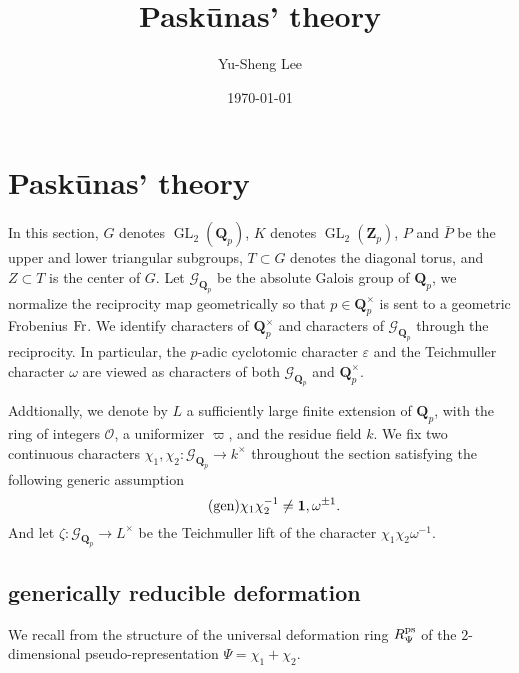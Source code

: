 \documentclass[leqno]{amsart}
\newcommand{\Gp}{\mathcal{G}_{\Qp}} %
\newcommand{\Fr}{\textnormal{Fr}} %
\newcommand{\ps}{\textnormal{ps}}
\DeclareMathOperator{\GL}{GL}
\newcommand{\Qp}{\mathbf{Q}_p}
\newcommand{\Zp}{\mathbf{Z}_p}
\newcommand{\oo}{\mathcal O}
\newcommand{\id}{\mathbf{1}}
\newcommand{\1}{\mathbf{1}}
\theoremstyle{definition}
\theoremstyle{remark}
\begin{document}
\title{Pask\={u}nas' theory}
\author[Y-S.~Lee]{Yu-Sheng Lee}
\address{Department of Mathematics, University  of Michigan, Ann Arbor, MI 48109, USA}
\date{\today}

\maketitle
\setcounter{tocdepth}{1}
\tableofcontents





\section{Pask\={u}nas' theory}

In this section,
$G$ denotes  $\GL_2(\Qp)$, 
$K$ denotes  $\GL_2(\Zp)$,  
$P$ and  $\bar{P}$ 
be the upper and lower triangular subgroups,
$T\subset G$ denotes the diagonal torus,
and  $Z\subset T$ is the center of  $G$.
Let  $\Gp$ be the absolute Galois group of  $\Qp$,
we normalize the reciprocity map  geometrically
so that  $p\in \Qp^\times$
is sent to a geometric Frobenius  $\Fr$.
We identify characters of  $\Qp^\times$
and characters of  $\Gp$ through the reciprocity.
In particular, 
the $p$-adic cyclotomic character $\varepsilon$ 
and the Teichmuller character $\omega$
are viewed as characters of both  $\Gp$ and  $\Qp^\times$.

Addtionally,
we denote by $L$ a sufficiently large 
finite extension of  $\Qp$,
with the ring of integers  $\oo$,
a uniformizer  $\varpi$,
and the residue field $k$.
We fix 
two continuous characters
$\chi_1,\chi_2\colon \Gp\to k^\times$ 
throughout the section satisfying
the following generic assumption
\begin{equation}\label{cond:generic}\tag{\text{gen}}
	\chi_1\chi_2^{-1}\neq \id,\omega^{\pm1}.
\end{equation}
And let $\zeta\colon \Gp\to L^\times$
be the Teichmuller lift of the character  $\chi_1\chi_2\omega^{-1}$.



\subsection{generically reducible deformation}

We recall from \cite[\S B.1]{pask}
the structure of the universal deformation ring $R_{\Psi}^{\ps}$
of the $2$-dimensional pseudo-representation $\Psi=\chi_1+\chi_2$. 
\end{document}
